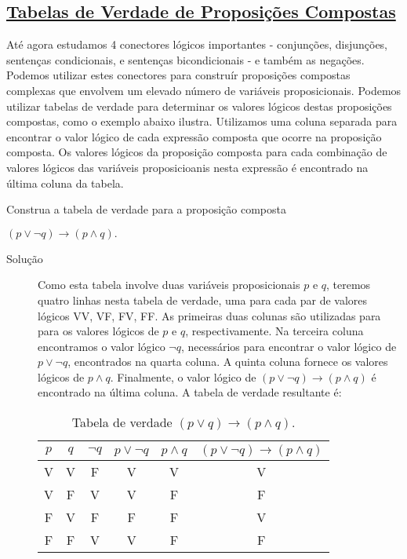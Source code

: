 \subsection*{\underline{Tabelas de Verdade de Proposições Compostas}}

Até agora estudamos 4 conectores lógicos importantes - conjunções, disjunções,
sentenças condicionais, e sentenças bicondicionais - e também as negações.
Podemos utilizar estes conectores para construír proposições compostas complexas
que envolvem um elevado número de variáveis proposicionais. Podemos utilizar
tabelas de verdade para determinar os valores lógicos destas proposições
compostas, como o exemplo abaixo ilustra. Utilizamos uma coluna separada para
encontrar o valor lógico de cada expressão composta que ocorre na proposição
composta. Os valores lógicos da proposição composta para cada combinação de
valores lógicos das variáveis proposicioanis nesta expressão é encontrado na
última coluna da tabela.

\label{exem19}
\begin{exmp}
Construa a tabela de verdade para a proposição composta \begin{center}$(p \lor
\lnot q) \to (p \land q).$\end{center}
\end{exmp}

\begin{description}
\item[Solução] Como esta tabela involve duas variáveis proposicionais $p$ e $q$,
teremos quatro linhas nesta tabela de verdade, uma para cada par de valores
lógicos VV, VF, FV, FF. As primeiras duas colunas são utilizadas para para os
valores lógicos de $p$ e $q$, respectivamente. Na terceira coluna encontramos o
valor lógico $\lnot q$, necessários para encontrar o valor lógico de $p \lor
\lnot q$, encontrados na quarta coluna. A quinta coluna fornece os valores
lógicos de $p \land q$. Finalmente, o valor lógico de $(p \lor \lnot q) \to (p
\land q)$ é encontrado na última coluna. A tabela de verdade resultante é:\\

\begin{table}[H]
	\centering
	\begin{tabular}{|c|c|c|c|c|c|}%
	\toprule
	\textbf{$p$} & \textbf{$q$}	& \textbf{$\lnot q$} & \textbf{$p \lor \lnot q$} &
	\textbf{$p \land q$} & \textbf{$(p \lor \lnot q) \to (p \land q)$}\\
	\midrule
	V &	V & F & V & V & V\\
	V &	F & V & V & F & F\\
	F &	V & F & F & F & V\\
	F &	F & V & V & F & F\\
	\bottomrule%
	\end{tabular}%
	\caption{Tabela de verdade $(p \lor q) \to
(p \land q)$.}
	\label{tab17}
\end{table}
\end{description}

